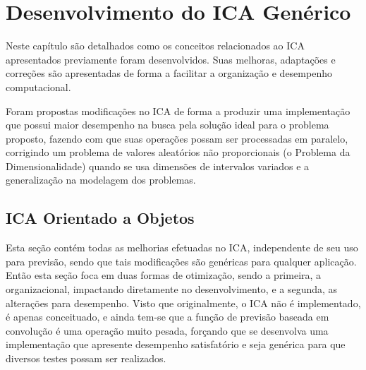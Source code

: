 

\chapter{Desenvolvimento do ICA Genérico}
\label{Desenvolvimento}


Neste capítulo são detalhados como os conceitos relacionados ao ICA apresentados previamente foram desenvolvidos. Suas melhoras, adaptações e correções são apresentadas de forma a facilitar a organização e desempenho computacional. 

Foram propostas modificações no ICA de forma a produzir uma implementação que possui maior desempenho na busca pela solução ideal para o problema proposto, fazendo com que suas operações possam ser processadas em paralelo, corrigindo um problema de valores aleatórios não proporcionais (o Problema da Dimensionalidade) quando se usa dimensões de intervalos variados e a generalização na modelagem dos problemas.





\section{ICA Orientado a Objetos}
\label{ICA Orientado a Objetos}

Esta seção contém todas as melhorias efetuadas no ICA, independente de seu uso para previsão, sendo que tais modificações são genéricas para qualquer aplicação. Então esta seção foca em duas formas de otimização, sendo a primeira, a organizacional, impactando diretamente no desenvolvimento, e a segunda, as alterações para desempenho. Visto que originalmente, o ICA não é implementado, é apenas conceituado, e ainda tem-se que a função de previsão baseada em convolução é uma operação muito pesada, forçando que se desenvolva uma implementação que apresente desempenho satisfatório e seja genérica para que diversos testes possam ser realizados.

